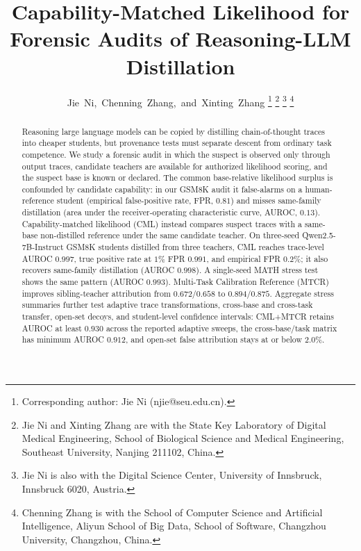 \documentclass[journal]{IEEEtran}
\begin{document}
\title{Capability-Matched Likelihood for Forensic Audits of Reasoning-LLM Distillation}

\author{Jie~Ni,~Chenning~Zhang,~and~Xinting~Zhang%
\thanks{Corresponding author: Jie Ni (njie@seu.edu.cn).}
\thanks{Jie Ni and Xinting Zhang are with the State Key Laboratory of Digital Medical Engineering, School of Biological Science and Medical Engineering, Southeast University, Nanjing 211102, China.}
\thanks{Jie Ni is also with the Digital Science Center, University of Innsbruck, Innsbruck 6020, Austria.}
\thanks{Chenning Zhang is with the School of Computer Science and Artificial Intelligence, Aliyun School of Big Data, School of Software, Changzhou University, Changzhou, China.}
}

\maketitle

\begin{abstract}
Reasoning large language models can be copied by distilling chain-of-thought traces
into cheaper students, but provenance tests must separate descent from ordinary task
competence. We study a forensic audit in which the suspect is observed only through
output traces, candidate teachers are available for authorized likelihood scoring,
and the suspect base is known or declared. The common base-relative likelihood
surplus is confounded by candidate capability: in our GSM8K audit it false-alarms
on a human-reference student (empirical false-positive rate, FPR, $0.81$) and misses
same-family distillation (area under the receiver-operating characteristic curve,
AUROC, $0.13$). Capability-matched likelihood (CML) instead compares suspect traces
with a same-base non-distilled reference under the same candidate teacher. On
three-seed Qwen2.5-7B-Instruct GSM8K students distilled from three teachers, CML
reaches trace-level AUROC $0.997$, true positive rate at $1\%$ FPR $0.991$, and
empirical FPR $0.2\%$; it also recovers same-family distillation (AUROC $0.998$). A
single-seed MATH stress test shows the same pattern (AUROC $0.993$). Multi-Task
Calibration Reference (MTCR) improves sibling-teacher attribution from
$0.672$/$0.658$ to $0.894$/$0.875$. Aggregate stress summaries further test adaptive
trace transformations, cross-base and cross-task transfer, open-set decoys, and
student-level confidence intervals: CML+MTCR retains AUROC at least $0.930$ across
the reported adaptive sweeps, the cross-base/task matrix has minimum AUROC $0.912$,
and open-set false attribution stays at or below $2.0\%$.

\end{abstract}
\end{document}

